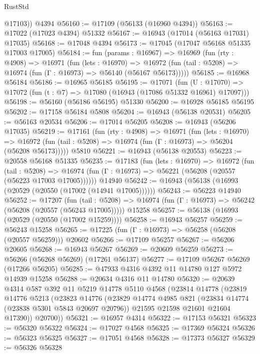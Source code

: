 \begin{lexlean}{RustStd}
\begin{coremodule}
        @17103))
    @4394
@56160 := @17109 (@56133 (@16960 @4394))
@56163 := @17022 (@17023 @4394) @51332
@56167 := @16943 (@17014 (@56163 @17031) @17035)
@56168 := @17048 @4394
@56173 := @17045 (@17047 @56168 @51335 @17003 @17005)
@56184 := fun (params : @16967) =>
  @16969
    (fun (rty : @4908) =>
    @16971
      (fun (lets : @16970) =>
      @16972 (fun (tail : @5208) => @16974 (fun (Γ : @16973) => @56140 (@56167 @56173)))))
@56185 := @16968 @56184
@56186 := @16965 @56185
@56195 := @17071
    (fun (U : @17070) => @17072 (fun (t : @7) => @17080 (@16943 (@17086 @51332 @16961) @17097)))
@56198 := @56160 (@56186 @56195) @51330
@56200 := @16928 @56185 @56195
@56202 := @17158 @56184 @5808
@56204 := @16943 (@56138 @20531)
@56205 := @56163 @20534
@56206 := @17014 @56205
@56208 := @16943 (@56206 @17035)
@56219 := @17161
    (fun (rty : @4908) =>
    @16971
      (fun (lets : @16970) =>
      @16972 (fun (tail : @5208) => @16974 (fun (Γ : @16973) => @56204 (@56208 @56173)))))
    @5810
@56221 := @16943 (@56138 @20553)
@56223 := @20558 @56168 @51335
@56235 := @17183
    (fun (lets : @16970) =>
    @16972
      (fun (tail : @5208) =>
      @16974 (fun (Γ : @16973) => @56221 (@56208 (@20557 (@56223 @17003 @17005))))))
    @14940
@56242 := @16943 (@56138 (@16993 (@20529 (@20550 (@17002 (@14941 @17005))))))
@56243 := @56223 @14940
@56252 := @17207
    (fun (tail : @5208) => @16974 (fun (Γ : @16973) => @56242 (@56208 (@20557 (@56243 @17005)))))
    @15258
@56257 := @56138 (@16993 (@20529 (@20550 (@17002 @15259))))
@56258 := @16943 @56257
@56259 := @56243 @15258
@56265 := @17225 (fun (Γ : @16973) => @56258 (@56208 (@20557 @56259))) @20602
@56266 := @17109 @56257
@56267 := @56206 @20605
@56268 := @16943 @56267
@56269 := @20609 @56259
@56273 := @56266 (@56268 @56269) (@17261 @56137)
@56277 := @17109 @56267 @56269 (@17266 @56205)
@56285 := @47933 @4316 @4392 @11 @14780 @127 @5972 @14939 @15258
@56288 := @20634 @4316 @11 @14780
@56320 := @20639
    @4314
    @587
    @392
    @11
    @5219
    @14778
    @5110
    @4568
    (@23814
      @14778
      (@23819
        @14776
        @5213
        (@23823
          @14776
          (@23829
            @14774
            @4985
            @821
            (@23834 @14774 (@23838 @5301 @5843 @20697 @20796))
            @21595
            @21598
            @21601
            @21604
            @17390))
        @20700))
@56321 := @16957 @4314
@56322 := @17153 @56321
@56323 := @56320 @56322
@56324 := @17027 @4568
@56325 := @17369 @56324
@56326 := @56323 @56325
@56327 := @17051 @4568
@56328 := @17373 @56327
@56329 := @56326 @56328

\end{coremodule}
\end{lexlean}

